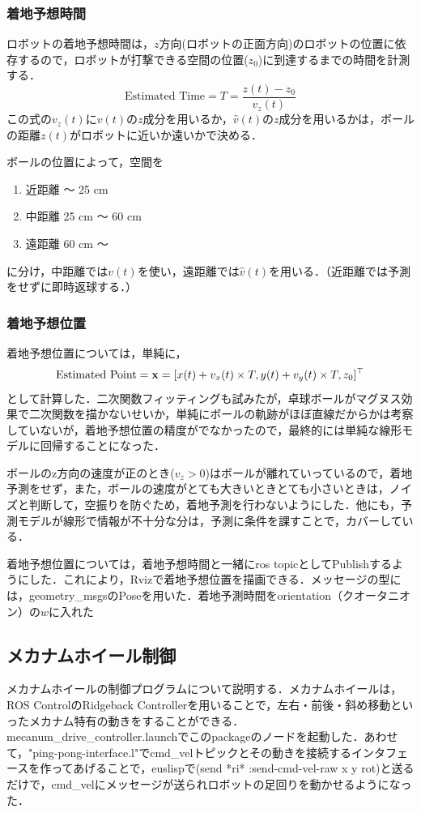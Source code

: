 \documentclass[10pt, oneside, titlepage]{ltjarticle}  %
\begin{document}
    \subsubsection{着地予想時間}
    ロボットの着地予想時間は，$z$方向(ロボットの正面方向)のロボットの位置に依存するので，ロボットが打撃できる空間の位置($z_0$)に到達するまでの時間を計測する．
    \[\mbox{Estimated Time} = T = \frac{z(t)-z_0}{v_z(t)}\]
    この式の$v_z(t)$に$v(t)$の$z$成分を用いるか，$\hat{v}(t)$の$z$成分を用いるかは，ボールの距離$z(t)$がロボットに近いか遠いかで決める．

    ボールの位置によって，空間を
    \begin{enumerate}
    \item 近距離 〜 25 cm
    \item 中距離 25 cm 〜 60 cm
    \item 遠距離 60 cm 〜
    \end{enumerate}
    に分け，中距離では$v(t)$を使い，遠距離では$\hat{v}(t)$を用いる．（近距離では予測をせずに即時返球する．）

    \subsubsection{着地予想位置}
    着地予想位置については，単純に，
    \[\mbox{Estimated Point} = {\bf x} = [x(t)+v_x(t)\times T, y(t)+v_y(t)\times T, z_0]^\top\]
    として計算した．二次関数フィッティングも試みたが，卓球ボールがマグヌス効果で二次関数を描かないせいか，単純にボールの軌跡がほぼ直線だからかは考察していないが，着地予想位置の精度がでなかったので，最終的には単純な線形モデルに回帰することになった．

    ボールのz方向の速度が正のとき($v_z>0$)はボールが離れていっているので，着地予測をせず，また，ボールの速度がとても大きいときとても小さいときは，ノイズと判断して，空振りを防ぐため，着地予測を行わないようにした．他にも，予測モデルが線形で情報が不十分な分は，予測に条件を課すことで，カバーしている．

    着地予想位置については，着地予想時間と一緒にros topicとしてPublishするようにした．これにより，Rvizで着地予想位置を描画できる．メッセージの型には，geometry\_msgsのPoseを用いた．着地予測時間をorientation（クオータニオン）の$w$に入れた

  \subsection{メカナムホイール制御}
  メカナムホイールの制御プログラムについて説明する．メカナムホイールは，ROS ControlのRidgeback Controllerを用いることで，左右・前後・斜め移動といったメカナム特有の動きをすることができる\cite{mecanum}．mecanum\_drive\_controller.launchでこのpackageのノードを起動した．あわせて，"ping-pong-interface.l"でcmd\_velトピックとその動きを接続するインタフェースを作ってあげることで，euslispで(send *ri* :send-cmd-vel-raw x y rot)と送るだけで，cmd\_velにメッセージが送られロボットの足回りを動かせるようになった．
\end{document}
